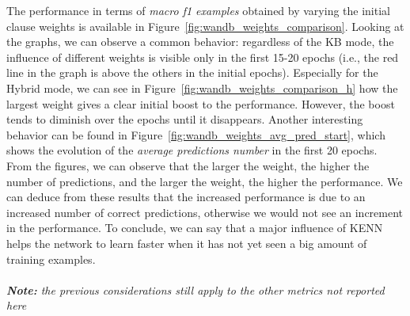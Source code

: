 The performance in terms of \textit{macro f1 examples} obtained by varying the initial clause weights is available in Figure~\ref{fig:wandb_weights_comparison}. Looking at the graphs, we can observe a common behavior: regardless of the KB mode, the influence of different weights is visible only in the first 15-20 epochs (i.e., the red line in the graph is above the others in the initial epochs). Especially for the Hybrid mode, we can see in Figure~\ref{fig:wandb_weights_comparison_h} how the largest weight gives a clear initial boost to the performance. However, the boost tends to diminish over the epochs until it disappears. Another interesting behavior can be found in Figure~\ref{fig:wandb_weights_avg_pred_start}, which shows the evolution of the \textit{average predictions number} in the first 20 epochs. From the figures, we can observe that the larger the weight, the higher the number of predictions, and the larger the weight, the higher the performance. We can deduce from these results that the increased performance is due to an increased number of correct predictions, otherwise we would not see an increment in the performance. To conclude, we can say that a major influence of KENN helps the network to learn faster when it has not yet seen a big amount of training examples.
\\\\
\textit{\textbf{Note:} the previous considerations still apply to the other metrics not reported here}

